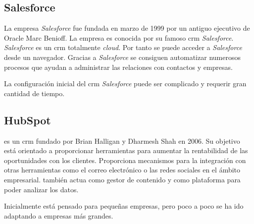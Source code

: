 \subsection{Salesforce}
La empresa \textit{Salesforce} fue fundada en marzo de 1999 por un antiguo ejecutivo de Oracle Marc Benioff. La empresa es conocida por su famoso \acrshort{crm}
\textit{Salesforce}. \textit{Salesforce} es un \acrshort{crm} totalmente \textit{cloud}. Por tanto se puede acceder a \textit{Salesforce} desde un navegador. Gracias a \textit{Salesforce} se consiguen automatizar numerosos procesos que ayudan a administrar las relaciones con contactos y empresas.

La configuración inicial del \acrshort{crm} \textit{Salesforce} puede ser complicado y requerir gran cantidad de tiempo.


\subsection{HubSpot}

\hs{} es un \acrshort{crm} fundado por Brian Halligan y Dharmesh Shah en 2006. Su objetivo está orientado a proporcionar herramientas para aumentar la rentabilidad de las oportunidades con los clientes. Proporciona mecanismos para la integración con otras herramientas como el correo electrónico o las redes sociales en el ámbito empresarial. \hs{} también actua como gestor de contenido y como plataforma para poder analizar los datos.

Inicialmente está pensado para pequeñas empresas, pero poco a poco se ha ido adaptando a empresas más grandes.
